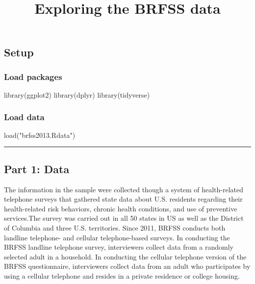 \documentclass[
]{article}
\title{Exploring the BRFSS data}
\author{}
\date{\vspace{-2.5em}}
\newenvironment{Shaded}{\begin{snugshade}}{\end{snugshade}}
\newcommand{\FunctionTok}[1]{\textcolor[rgb]{0.00,0.00,0.00}{#1}}
\newcommand{\NormalTok}[1]{#1}
\newcommand{\StringTok}[1]{\textcolor[rgb]{0.31,0.60,0.02}{#1}}
\begin{document}
\maketitle

\hypertarget{setup}{%
\subsection{Setup}\label{setup}}

\hypertarget{load-packages}{%
\subsubsection{Load packages}\label{load-packages}}

\begin{Shaded}
\begin{Highlighting}[]
\FunctionTok{library}\NormalTok{(ggplot2)}
\FunctionTok{library}\NormalTok{(dplyr)}
\FunctionTok{library}\NormalTok{(tidyverse)}
\end{Highlighting}
\end{Shaded}

\hypertarget{load-data}{%
\subsubsection{Load data}\label{load-data}}

\begin{Shaded}
\begin{Highlighting}[]
\FunctionTok{load}\NormalTok{(}\StringTok{"brfss2013.Rdata"}\NormalTok{)}
\end{Highlighting}
\end{Shaded}

\begin{center}\rule{0.5\linewidth}{0.5pt}\end{center}

\hypertarget{part-1-data}{%
\subsection{Part 1: Data}\label{part-1-data}}

The information in the sample were collected though a system of
health-related telephone surveys that gathered state data about U.S.
residents regarding their health-related risk behaviors, chronic health
conditions, and use of preventive services.The survey was carried out in
all 50 states in US as well as the District of Columbia and three U.S.
territories. Since 2011, BRFSS conducts both landline telephone- and
cellular telephone-based surveys. In conducting the BRFSS landline
telephone survey, interviewers collect data from a randomly selected
adult in a household. In conducting the cellular telephone version of
the BRFSS questionnaire, interviewers collect data from an adult who
participates by using a cellular telephone and resides in a private
residence or college housing.
\end{document}
